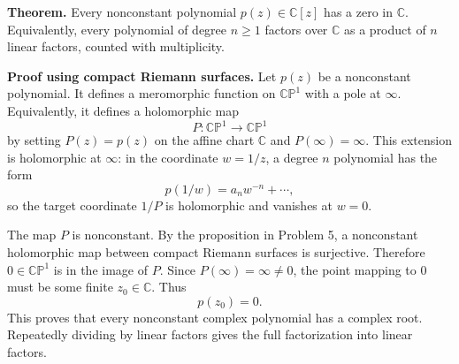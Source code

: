 \documentclass[11pt]{article}
\newcommand{\C}{\mathbb{C}}
\newcommand{\CP}{\mathbb{CP}}
\begin{document}
\textbf{Theorem.}
Every nonconstant polynomial $p(z)\in\C[z]$ has a zero in $\C$. Equivalently, every polynomial of degree $n\geq1$ factors over $\C$ as a product of $n$ linear factors, counted with multiplicity.

\textbf{Proof using compact Riemann surfaces.}
Let $p(z)$ be a nonconstant polynomial. It defines a meromorphic function on $\CP^1$ with a pole at $\infty$. Equivalently, it defines a holomorphic map
\[
 P:\CP^1\to\CP^1
\]
by setting $P(z)=p(z)$ on the affine chart $\C$ and $P(\infty)=\infty$.
This extension is holomorphic at $\infty$: in the coordinate $w=1/z$, a degree $n$ polynomial has the form
\[
 p(1/w)=a_nw^{-n}+\cdots,
\]
so the target coordinate $1/P$ is holomorphic and vanishes at $w=0$.

The map $P$ is nonconstant. By the proposition in Problem 5, a nonconstant holomorphic map between compact Riemann surfaces is surjective. Therefore $0\in\CP^1$ is in the image of $P$.
Since $P(\infty)=\infty\neq0$, the point mapping to $0$ must be some finite $z_0\in\C$. Thus
\[
 p(z_0)=0.
\]
This proves that every nonconstant complex polynomial has a complex root. Repeatedly dividing by linear factors gives the full factorization into linear factors.
\end{document}
